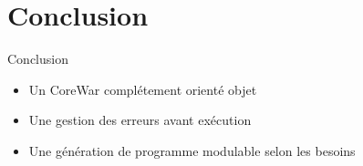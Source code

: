\documentclass{beamer}
\begin{document}
\section{Conclusion}%

\begin{frame}
\begin{center}
{\Large Conclusion}
\vspace{5mm}
\begin{itemize}
    \item Un CoreWar complétement orienté objet
    \item Une gestion des erreurs avant exécution
    \item Une génération de programme modulable selon les besoins
\end{itemize}
\end{center}
\end{frame}
\end{document}
